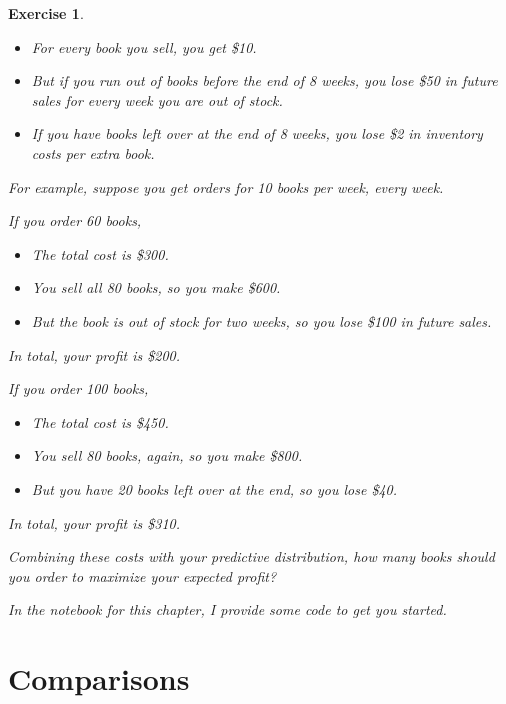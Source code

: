 \documentclass[12pt]{book}
\theoremstyle{exercise}
\newtheorem{exercise}{Exercise}[chapter]
\begin{document}
\begin{exercise}
\begin{itemize}
\item For every book you sell, you get \$10.

\item But if you run out of books before the end of 8 weeks, you lose \$50 in future sales for every week you are out of stock.

\item If you have books left over at the end of 8 weeks, you lose \$2 in inventory costs per extra book.
\end{itemize}

For example, suppose you get orders for 10 books per week, every week.

If you order 60 books, 
\begin{itemize}

\item The total cost is \$300.  

\item You sell all 80 books, so you make \$600.  

\item But the book is out of stock for two weeks, so you lose \$100 in future sales.
\end{itemize}

In total, your profit is \$200.

If you order 100 books,
\begin{itemize}

\item The total cost is \$450.

\item You sell 80 books, again, so you make \$800.

\item But you have 20 books left over at the end, so you lose \$40.
\end{itemize}

In total, your profit is \$310.

Combining these costs with your predictive distribution, how many books should you order to maximize your expected profit?

In the notebook for this chapter, I provide some code to get you started.

\end{exercise}




\chapter{Comparisons}
\label{comparison}
\end{document}
